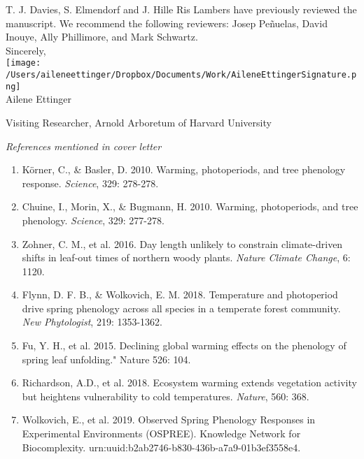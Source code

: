 \documentclass[10.5pt,a4paper]{letter}
\begin{document}
\begin{letter}{}
T. J. Davies, S. Elmendorf and  J. Hille Ris Lambers have previously reviewed the manuscript. We recommend the following reviewers: Josep Pe\~nuelas, David Inouye, Ally Phillimore, and Mark Schwartz. \\

Sincerely,\\

\texttt{[image: /Users/aileneettinger/Dropbox/Documents/Work/AileneEttingerSignature.png]} \\
Ailene Ettinger\\
\begin{footnotesize}
Visiting Researcher, Arnold Arboretum of Harvard University 

\newpage
\noindent \emph{References mentioned in cover letter}

\begin{enumerate}
\item K\"orner, C., \& Basler, D. 2010. Warming, photoperiods, and tree phenology response. \emph{Science}, 329: 278-278.
\item Chuine, I., Morin, X., \& Bugmann, H. 2010. Warming, photoperiods, and tree phenology. \emph{Science}, 329: 277-278.
\item Zohner, C. M., et al. 2016. Day length unlikely to constrain climate-driven shifts in leaf-out times of northern woody plants. \emph{Nature Climate Change}, 6: 1120.
\item Flynn, D. F. B., \& Wolkovich, E. M. 2018. Temperature and photoperiod drive spring phenology across all species in a temperate forest community. \emph{New Phytologist}, 219: 1353-1362.
\item Fu, Y. H., et al. 2015. Declining global warming effects on the phenology of spring leaf unfolding." Nature 526: 104.
\item Richardson, A.D., et al. 2018. Ecosystem warming extends vegetation activity but heightens vulnerability to cold temperatures.  \emph{Nature}, 560: 368.
\item Wolkovich, E., et al. 2019. Observed Spring Phenology Responses in Experimental Environments (OSPREE). Knowledge Network for Biocomplexity. urn:uuid:b2ab2746-b830-436b-a7a9-01b3ef3558e4. 
\end{enumerate}
\end{footnotesize}



\end{letter}
\end{document}
